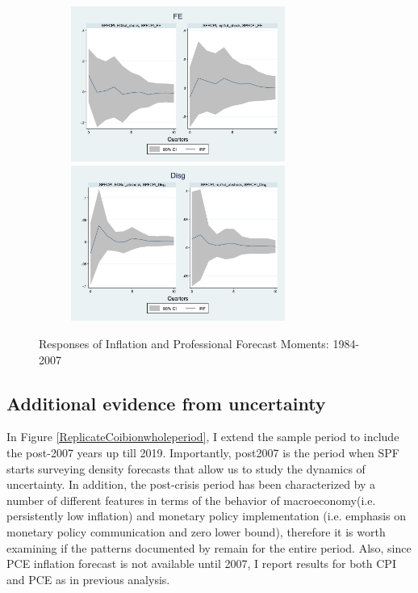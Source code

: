 \documentclass[12pt]{article}
\begin{document}
\begin{figure}[p]
\begin{subfigure}[b]{0.5\textwidth}
		\smallskip
		\includegraphics[width=7cm]{figures/SPFFE_ashocks_before2007.png} 
		\smallskip
		\includegraphics[width=7cm]{figures/SPFDisg_ab_ashocks_before2007.png} 
	\end{subfigure}
	\caption{Responses of Inflation and Professional Forecast Moments: 1984-2007}
	\label{ReplicateCoibionBefore2007}
\end{figure}

	
	\subsection{Additional evidence from uncertainty}
	
	In Figure \ref{ReplicateCoibionwholeperiod}, I extend the sample period to include the post-2007 years up till 2019. Importantly, post2007 is the period when SPF starts surveying density forecasts that allow us to study the dynamics of uncertainty. In addition, the post-crisis period has been characterized by a number of different features in terms of the behavior of macroeconomy(i.e. persistently low inflation) and monetary policy implementation (i.e. emphasis on monetary policy communication and zero lower bound), therefore it is worth examining if the patterns documented by \cite{coibion2012can} remain for the entire period. Also, since PCE inflation forecast is not available until 2007, I report results for both CPI and PCE as in previous analysis. 
	
\end{document}
